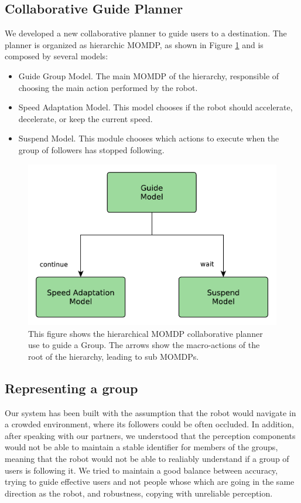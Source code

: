 \subsection{Collaborative Guide Planner }
\label{subsec:case_study-spencer-collaborative_guide_planner}

We developed a new collaborative planner to guide users to a destination. The planner is organized as hierarchic MOMDP, as shown in Figure \ref{fig:case_study-spencer-guide_planner} and is composed by several models:
\begin{itemize}
\item Guide Group Model. The main MOMDP of the hierarchy, responsible of choosing the main action performed by the robot.
\item Speed Adaptation Model. This model chooses if the robot should accelerate, decelerate, or keep the current speed.
\item Suspend Model. This module chooses which actions to execute when the group of followers has stopped following.
\end{itemize}



\begin{figure}[ht!]
	\centering
	\includegraphics[scale=0.45]{img/case_study/spencer/guide_planner.pdf}
	\caption{This figure shows the hierarchical MOMDP collaborative planner use to guide a Group. The arrows show the macro-actions of the root of the hierarchy, leading to sub MOMDPs.}
	\label{fig:case_study-spencer-guide_planner}
\end{figure}

\subsection{Representing a group}
Our system has been built with the assumption that the robot would navigate in a crowded environment, where its followers could be often occluded. In addition, after speaking with our partners, we understood that the perception components would not be able to maintain a stable identifier for members of the groups, meaning that the robot would not be able to realiably understand if a group of users is following it. We tried to maintain a good balance between accuracy, trying to guide effective users and not people whose which are going in the same direction as the robot, and robustness, copying with unreliable perception.

